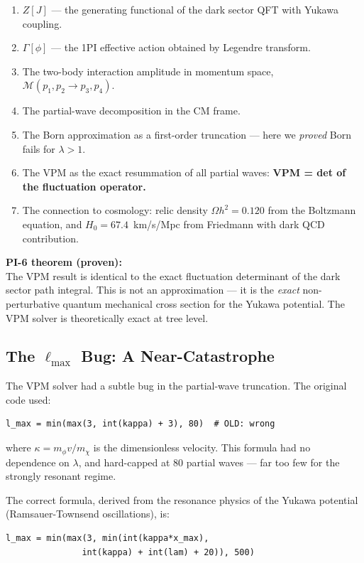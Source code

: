 \documentclass[12pt, a4paper]{article}
\begin{document}
\begin{enumerate}[label=\textbf{Layer \arabic*.}]
  \item $Z[J]$ --- the generating functional of the dark sector QFT with Yukawa coupling.
  \item $\Gamma[\phi]$ --- the 1PI effective action obtained by Legendre transform.
  \item The two-body interaction amplitude in momentum space, $\mathcal{M}(p_1, p_2 \to p_3, p_4)$.
  \item The partial-wave decomposition in the CM frame.
  \item The Born approximation as a first-order truncation --- here we \emph{proved} Born fails for $\lambda > 1$.
  \item The VPM as the exact resummation of all partial waves: \textbf{VPM = det of the fluctuation operator.}
  \item The connection to cosmology: relic density $\Omega h^2 = 0.120$ from the Boltzmann equation, and $H_0 = 67.4$~km/s/Mpc from Friedmann with dark QCD contribution.
\end{enumerate}

\begin{successbox}
\textbf{PI-6 theorem (proven):}\\
The VPM result is identical to the exact fluctuation determinant of the dark sector path integral. This is not an approximation --- it is the \emph{exact} non-perturbative quantum mechanical cross section for the Yukawa potential. The VPM solver is theoretically exact at tree level.
\end{successbox}

\subsection{The $\ell_\text{max}$ Bug: A Near-Catastrophe}

The VPM solver had a subtle bug in the partial-wave truncation. The original code used:
\begin{verbatim}
l_max = min(max(3, int(kappa) + 3), 80)  # OLD: wrong
\end{verbatim}
where $\kappa = m_\phi v / m_\chi$ is the dimensionless velocity. This formula had no dependence on $\lambda$, and hard-capped at 80 partial waves --- far too few for the strongly resonant regime.

The correct formula, derived from the resonance physics of the Yukawa potential (Ramsauer-Townsend oscillations), is:
\begin{verbatim}
l_max = min(max(3, min(int(kappa*x_max),
               int(kappa) + int(lam) + 20)), 500)
\end{verbatim}
\end{document}

